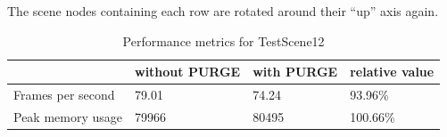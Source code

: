 		The scene nodes containing each row are rotated around their ``up'' axis again. %

		\begin{table}[htpb]
			\center
			\caption{Performance metrics for TestScene12}
			\begin{tabular}{l | l | l | l}
				& without PURGE & with PURGE & relative value\\ \hline
				Frames per second & 79.01 & 74.24 & 93.96\%\\
				Peak memory usage & 79966 & 80495 & 100.66\%\\
			\end{tabular}
			\label{tbl:Performance12}
		\end{table}

